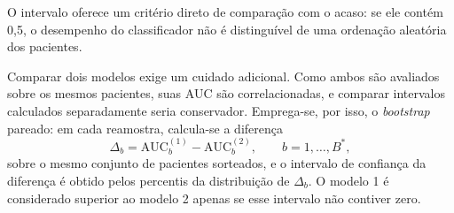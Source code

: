 O intervalo oferece um critério direto de comparação com o acaso: se ele
contém 0,5, o desempenho do classificador não é distinguível de uma
ordenação aleatória dos pacientes.

Comparar dois modelos exige um cuidado adicional. Como ambos são avaliados
sobre os mesmos pacientes, suas \gls{AUC} são correlacionadas, e comparar
intervalos calculados separadamente seria conservador. Emprega-se, por isso,
o \textit{bootstrap} pareado: em cada reamostra, calcula-se a diferença
\begin{equation}
	\Delta_b = \mathrm{AUC}_b^{(1)} - \mathrm{AUC}_b^{(2)}, \qquad b = 1, \dots, B^{*},
	\label{eq:delta-auc}
\end{equation}
\noindent
sobre o mesmo conjunto de pacientes sorteados, e o intervalo de confiança da
diferença é obtido pelos percentis da distribuição de $\Delta_b$. O modelo
1 é considerado superior ao modelo 2 apenas se esse intervalo não contiver zero.





